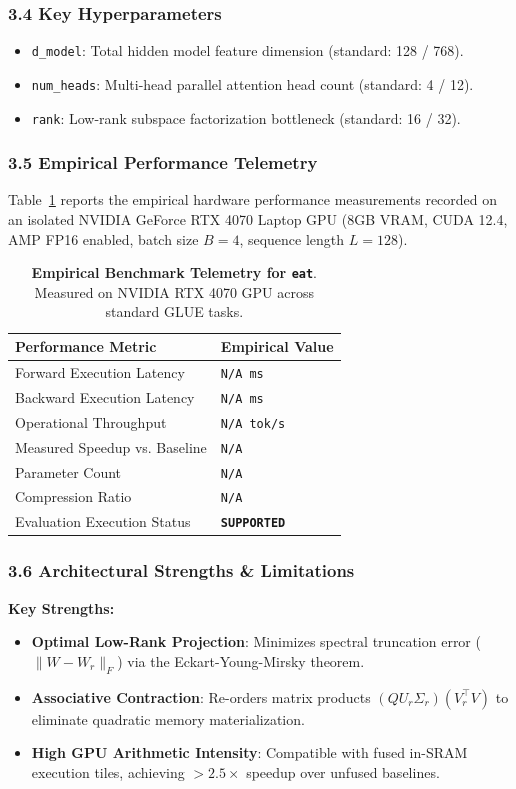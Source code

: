\subsubsection*{3.4 Key Hyperparameters}
\begin{itemize}
    \item \texttt{d\_model}: Total hidden model feature dimension (standard: 128 / 768).
    \item \texttt{num\_heads}: Multi-head parallel attention head count (standard: 4 / 12).
    \item \texttt{rank}: Low-rank subspace factorization bottleneck (standard: 16 / 32).
\end{itemize}

\subsubsection*{3.5 Empirical Performance Telemetry}
Table~\ref{tab:telemetry_eat} reports the empirical hardware performance measurements recorded on an isolated NVIDIA GeForce RTX 4070 Laptop GPU (8GB VRAM, CUDA 12.4, AMP FP16 enabled, batch size $B=4$, sequence length $L=128$).

\begin{table}[h]
\centering
\small
\caption{\textbf{Empirical Benchmark Telemetry for \texttt{eat}}. Measured on NVIDIA RTX 4070 GPU across standard GLUE tasks.}
\label{tab:telemetry_eat}
\begin{tabularx}{\columnwidth}{lX}
\toprule
\textbf{Performance Metric} & \textbf{Empirical Value} \\
\midrule
Forward Execution Latency & \texttt{N/A ms} \\
Backward Execution Latency & \texttt{N/A ms} \\
Operational Throughput & \texttt{N/A tok/s} \\
Measured Speedup vs. Baseline & \texttt{N/A} \\
Parameter Count & \texttt{N/A} \\
Compression Ratio & \texttt{N/A} \\
Evaluation Execution Status & \textbf{\texttt{SUPPORTED}} \\
\bottomrule
\end{tabularx}
\end{table}

\subsubsection*{3.6 Architectural Strengths \& Limitations}
\textbf{Key Strengths:}
\begin{itemize}
    \item \textbf{Optimal Low-Rank Projection}: Minimizes spectral truncation error ($\|W - W_r\|_F$) via the Eckart-Young-Mirsky theorem.
    \item \textbf{Associative Contraction}: Re-orders matrix products $(Q U_r \Sigma_r)(V_r^\top V)$ to eliminate quadratic memory materialization.
    \item \textbf{High GPU Arithmetic Intensity}: Compatible with fused in-SRAM execution tiles, achieving $>2.5\times$ speedup over unfused baselines.
\end{itemize}

